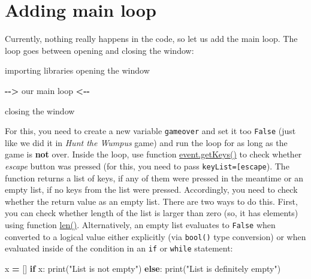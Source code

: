 \documentclass[
]{book}
\newenvironment{Shaded}{\begin{snugshade}}{\end{snugshade}}
\newcommand{\BuiltInTok}[1]{#1}
\newcommand{\ControlFlowTok}[1]{\textcolor[rgb]{0.13,0.29,0.53}{\textbf{#1}}}
\newcommand{\NormalTok}[1]{#1}
\newcommand{\OperatorTok}[1]{\textcolor[rgb]{0.81,0.36,0.00}{\textbf{#1}}}
\newcommand{\StringTok}[1]{\textcolor[rgb]{0.31,0.60,0.02}{#1}}
\begin{document}
\hypertarget{adding-main-loop}{%
\section{Adding main loop}\label{adding-main-loop}}

Currently, nothing really happens in the code, so let us add the main loop. The loop goes between opening and closing the window:

\begin{Shaded}
\begin{Highlighting}[]
\NormalTok{importing libraries}
\NormalTok{opening the window}

\OperatorTok{{-}{-}\textgreater{}}\NormalTok{ our main loop }\OperatorTok{\textless{}{-}{-}}

\NormalTok{closing the window}
\end{Highlighting}
\end{Shaded}

For this, you need to create a new variable \texttt{gameover} and set it too \texttt{False} (just like we did it in \emph{Hunt the Wumpus} game) and run the loop for as long as the game is \textbf{not} over. Inside the loop, use function \href{https://psychopy.org/api/event.html\#psychopy.event.getKeys}{event.getKeys()} to check whether \emph{escape} button was pressed (for this, you need to pass \texttt{keyList={[}\textquotesingle{}escape\textquotesingle{}{]}}). The function returns a list of keys, if any of them were pressed in the meantime or an empty list, if no keys from the list were pressed. Accordingly, you need to check whether the return value as an empty list. There are two ways to do this. First, you can check whether length of the list is larger than zero (so, it has elements) using function \href{https://docs.python.org/3/library/functions.html\#len}{len()}. Alternatively, an empty list evaluates to \texttt{False} when converted to a logical value either explicitly (via \texttt{bool()} type conversion) or when evaluated inside of the condition in an \texttt{if} or \texttt{while} statement:

\begin{Shaded}
\begin{Highlighting}[]
\NormalTok{x }\OperatorTok{=}\NormalTok{ []}
\ControlFlowTok{if}\NormalTok{ x:}
  \BuiltInTok{print}\NormalTok{(}\StringTok{"List is not empty"}\NormalTok{)}
\ControlFlowTok{else}\NormalTok{:}
  \BuiltInTok{print}\NormalTok{(}\StringTok{"List is definitely empty"}\NormalTok{)}
\end{Highlighting}
\end{Shaded}
\end{document}
